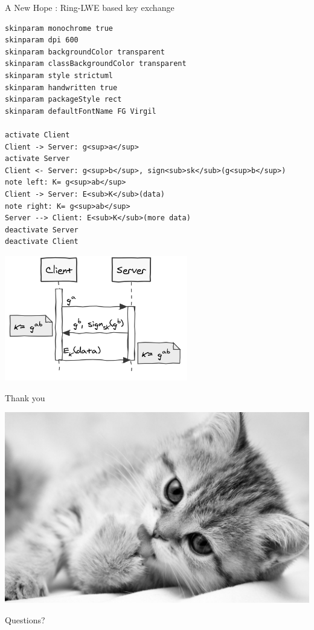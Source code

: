 \documentclass[presentation,smaller]{beamer}
\begin{document}
\begin{frame}[fragile,label={sec:org922b6c1}]{A New Hope  : Ring-LWE based key exchange}
 \lstset{language=plantuml,label= ,caption= ,captionpos=b,numbers=none}
\begin{lstlisting}
skinparam monochrome true
skinparam dpi 600
skinparam backgroundColor transparent
skinparam classBackgroundColor transparent
skinparam style strictuml
skinparam handwritten true
skinparam packageStyle rect
skinparam defaultFontName FG Virgil

activate Client
Client -> Server: g<sup>a</sup>
activate Server
Client <- Server: g<sup>b</sup>, sign<sub>sk</sub>(g<sup>b</sup>)
note left: K= g<sup>ab</sup>
Client -> Server: E<sub>K</sub>(data)
note right: K= g<sup>ab</sup>
Server --> Client: E<sub>K</sub>(more data)
deactivate Server
deactivate Client
\end{lstlisting}

\begin{center}
\begin{center}
\includegraphics[width=0.6\textwidth]{keyex.png}
\end{center}
\end{center}
\end{frame}

\begin{frame}[label={sec:orgb7eee94}]{Thank you}
\begin{center}
\begin{center}
\includegraphics[width=.9\linewidth]{./kitten-01.jpg}
\end{center}

\alert{\Large Questions?}
\end{center}
\end{frame}
\end{document}
